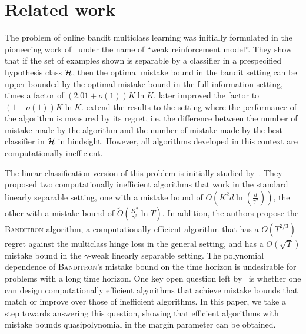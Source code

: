 \section{Related work}
\label{section:related-work}

The problem of online bandit multiclass learning was initially formulated in the
pioneering work of~\citet{Auer-Long-1999} under the name of ``weak reinforcement
model''. They show that if the set of examples shown is separable by a
classifier in a prespecified hypothesis class $\mathcal{H}$, then the optimal mistake
bound in the bandit setting can be upper bounded by the optimal mistake bound in
the full-information setting, times a factor of $(2.01 + o(1))K \ln K$.
\citet{Long-2017} later improved the factor to $(1 + o(1)) K \ln K$.
\citet{Daniely-Helbertal-2013} extend the results to the setting where the
performance of the algorithm is measured by its regret, i.e. the difference
between the number of mistake made by the algorithm and the number of mistake
made by the best classifier in $\mathcal{H}$ in hindsight. However, all algorithms
developed in this context are computationally inefficient.

The linear classification version of this problem is initially studied
by~\citet{Kakade-Shalev-Shwartz-Tewari-2008}. They proposed two computationally
inefficient algorithms that work in the standard linearly separable setting, one
with a mistake bound of $O(K^2 d \ln(\frac{d}{\gamma^2}))$, the other with a
mistake bound of $\widetilde{O}(\frac{K^2}{\gamma^2} \ln T)$. In addition, the
authors propose the \textsc{Banditron} algorithm, a computationally efficient
algorithm that has a $O(T^{2/3})$ regret against the multiclass hinge loss in
the general setting, and has a $O(\sqrt{T})$ mistake bound in the $\gamma$-weak
linearly separable setting. The polynomial dependence of \textsc{Banditron}'s
mistake bound on the time horizon is undesirable for problems with a long time
horizon. One key open question left by~\citet{Kakade-Shalev-Shwartz-Tewari-2008}
is whether one can design computationally efficient algorithms that achieve
mistake bounds that match or improve over those of inefficient algorithms. In
this paper, we take a step towards answering this question, showing that
efficient algorithms with mistake bounds quasipolynomial in the margin parameter
can be obtained.


